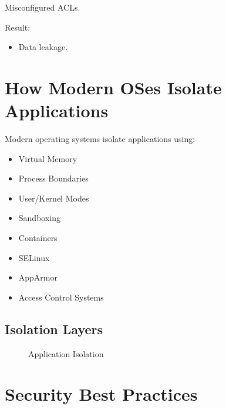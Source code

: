 Misconfigured ACLs.

Result:

\begin{itemize}
\item Data leakage.
\end{itemize}

\section{How Modern OSes Isolate Applications}

Modern operating systems isolate applications using:

\begin{itemize}
\item Virtual Memory
\item Process Boundaries
\item User/Kernel Modes
\item Sandboxing
\item Containers
\item SELinux
\item AppArmor
\item Access Control Systems
\end{itemize}

\subsection{Isolation Layers}

\begin{figure}[h]
\centering
{}
\caption{Application Isolation}
\end{figure}

\section{Security Best Practices}

